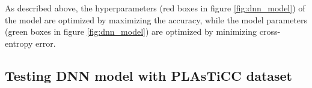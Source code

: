 \documentclass[useamsfonts]{pasj01}
\begin{document}
As described above, the hyperparameters (red boxes in figure \ref{fig:dnn_model}) of the model are optimized by maximizing the accuracy, while 
the model parameters (green boxes in figure \ref{fig:dnn_model}) are optimized by minimizing cross-entropy error.



\subsection{Testing DNN model with PLAsTiCC dataset} 
\label{sec:p}
\end{document}
